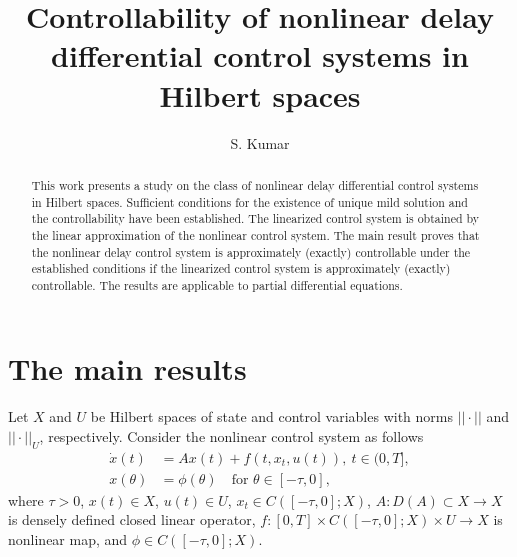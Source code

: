 \documentclass[12pt]{llncs}
\begin{document}
\fi

\newtheorem{asmp}{Assumption}

\title{Controllability of nonlinear delay differential control systems in Hilbert spaces}

\author{S. Kumar }

\maketitle

\begin{abstract}
This work presents a study on the class of nonlinear delay differential control systems in Hilbert spaces. Sufficient conditions for the existence of unique mild solution and the controllability have been established. The linearized control system is obtained by the linear approximation of the nonlinear control system. The main result proves that the nonlinear delay control system is approximately (exactly) controllable under the established conditions if the linearized control system is approximately (exactly) controllable. The results are applicable to partial differential equations.


\end{abstract}


\section{The main results}

Let $X$ and $U$ be Hilbert spaces of state and control variables with norms $||\cdot||$ and $||\cdot||_U$, respectively. Consider the nonlinear control system as follows
\begin{align}
\dot{x}(t) &= A x(t) + f(t, x_t, u(t)), ~ t \in (0,T], \label{eqn-main-nls} \\
x(\theta) &= \phi(\theta) \quad \text{for  } \theta \in [-\tau,0], \label{eqn-main-ic}
\end{align}
where $\tau>0$, $x(t) \in X$, $u(t) \in U$, $x_t \in C([-\tau,0];X)$, $A : D(A) \subset X \rightarrow X$ is densely defined closed linear operator, $f: [0,T] \times C([-\tau,0];X) \times U \rightarrow X$ is nonlinear map, and $\phi \in C([-\tau,0];X)$.
\end{document}
